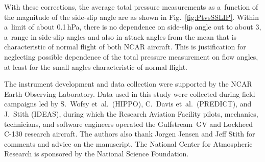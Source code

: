 \documentclass[amtd, online, hvmath]{copernicus}
\begin{document}
With these corrections, the average total pressure measurements as
a~function of the magnitude of the side-slip angle are as shown in
Fig.~\ref{fig:PtvsSSLIP}. Within a~limit of about 0.1\,hPa, there is
no dependence on side-slip angle out to about 3{\degree}, a~range
in side-slip angles and also in attack angles from the mean that is
characteristic of normal flight of both NCAR aircraft. This is
justification for neglecting possible dependence of the total pressure
measurement on flow angles, at least for the small angles
characteristic of normal flight.

\begin{acknowledgements}
  The instrument development and data collection were supported by the
  NCAR Earth Observing Laboratory. Data used in this study were
  collected during field campaigns led by S.~Wofsy et~al.~(HIPPO),
  C.~Davis et~al.~(PREDICT), and J.~Stith (IDEAS), during which the
  Research Aviation Facility pilots, mechanics, technicians, and
  software engineers operated the Gulfstream~GV and Lockheed C-130
  research aircraft.  The authors also thank Jorgen Jensen and Jeff
  Stith for comments and advice on the manuscript. The National Center
  for Atmospheric Research is sponsored by the National Science
  Foundation.
\end{acknowledgements}
\end{document}
